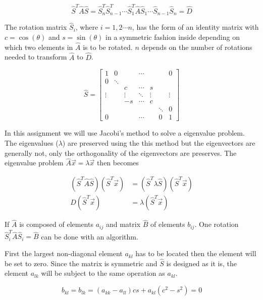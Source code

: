 \documentclass[twoside,twocolumn]{article}
\newcommand{\nl}{
	
	\medskip
	\noindent
}
\begin{document}
	\begin{equation*}
	\hat{S}^T\hat{A}\hat{S} = \hat{S}^T_n\hat{S}^T_{n-1}\cdots\hat{S}^T_1\hat{A}\hat{S}_1\cdots\hat{S}_{n-1}\hat{S}_n = \hat{D}
	\end{equation*}
	
	\noindent
	The rotation matrix $\hat{S}_i$, where $i = 1,2\cdots n$, has the form of an identity matrix with $c = \cos(\theta)$ and $s = \sin(\theta)$ in a symmetric fashion inside depending on which two elements in $\hat{A}$ is to be rotated. $n$ depends on the number of rotations needed to transform $\hat{A}$ to $\hat{D}$.   
	
	\begin{equation*}
	\hat{S} = \begin{bmatrix}
	1 & 0 & & \cdots & & & 0 \\
	0 & \ddots &  &  & & & \\
	&  & c & \cdots & s & &\\
	\vdots & & \vdots & \ddots & \vdots & &\vdots\\
	& & -s & \cdots & c & &\\
	& & & & &\ddots & 0\\
	0 & & & \cdots & & 0 & 1
	\end{bmatrix}
	\end{equation*}
	
	\noindent
	In this assignment we will use Jacobi's method to solve a eigenvalue problem. The eigenvalues ($\lambda$) are preserved using the this method but the eigenvectors are generally not, only the orthogonality of the eigenvectors are preserves. The eigenvalue problem $\hat{A}\vec{x} = \lambda\vec{x}$ then becomes 
	
	\begin{align*}
	(\hat{S}^T\hat{A}\hat{S})(\hat{S}^T\vec{x}) &= (\hat{S}^T\lambda\hat{S})(\hat{S}^T\vec{x})\\
	\hat{D}(\hat{S}^T\vec{x}) &= \lambda(\hat{S}^T\vec{x})
	\end{align*}
	
	
	\nl
	If $\hat{A}$ is composed of elements $a_{ij}$ and matrix $\hat{B}$ of elements $b_{ij}$. 
	One rotation $\hat{S}_i^T\hat{A}\hat{S}_i = \hat{B}$ can be done with an algorithm. 
	\nl
	First the largest non-diagonal element $a_{kl}$ has to be located then the element will be set to zero. Since the matrix is symmetric and $\hat{S}$ is designed as it is, the element $a_{lk}$ will be subject to the same operation as $a_{kl}$.
	
	\begin{equation*}
	b_{kl} = b_{lk} = (a_{kk}-a_{ll})cs + a_{kl}(c^2-s^2) = 0
	\end{equation*}
	
\end{document}

